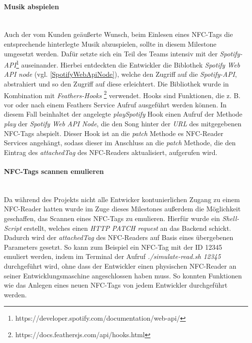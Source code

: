 \documentclass[10pt, a4paper]{article}
\begin{document}
\begin{onehalfspace}
\paragraph*{Musik abspielen} $~$ \\
Auch der vom Kunden geäußerte Wunsch, beim Einlesen eines NFC-Tags die entsprechende hinterlegte Musik abzuspielen, sollte in diesem Milestone umgesetzt werden.
Dafür setzte sich ein Teil des Teams intensiv mit der \textit{Spotify-API}\footnote{https://developer.spotify.com/documentation/web-api/} auseinander.
Hierbei entdeckten die Entwickler die Biblothek \textit{Spotify Web API node} (vgl. \ref*{SpotifyWebApiNode}), welche den Zugriff auf die \textit{Spotify-API},
abstrahiert und so den Zugriff auf diese erleichtert. Die Bibliothek wurde in Kombination mit \textit{Feathers-Hooks}
\footnote{https://docs.feathersjs.com/api/hooks.html} verwendet. Hooks sind Funktionen, die z. B. vor oder nach einem Feathers Service Aufruf ausgeführt werden
können. In diesem Fall beinhaltet der angelegte \textit{playSpotify} Hook einen Aufruf der Methode \textit{play} der \textit{Spotify Web API Node}, die den Song
hinter der \textit{URL} des mitgegebenen NFC-Tags abspielt. Dieser Hook ist an die \textit{patch} Methode es NFC-Reader Services angehängt, sodass dieser im
Anschluss an die \textit{patch} Methode, die den Eintrag des \textit{attachedTag} des NFC-Readers aktualisiert, aufgerufen wird.

\paragraph*{NFC-Tags scannen emulieren} $~$ \\
Da während des Projekts nicht alle Entwicker kontunierlichen Zugang zu einem NFC-Reader hatten wurde im Zuge dieses Milestones außerdem die Möglichkeit
geschaffen, das Scannen eines NFC-Tags zu emulieren. Hierfür wurde ein \textit{Shell-Script} erstellt, welches einen \textit{HTTP PATCH request} an
das Backend schickt. Dadurch wird der \textit{attachedTag} des NFC-Readers auf Basis eines übergebenen Parameters gesetzt. So kann zum Beispiel ein NFC-Tag mit
der ID 12345 emuliert werden, indem im Terminal der Aufruf \textit{./simulate-read.sh 12345} durchgeführt wird, ohne dass der Entwickler einen physischen NFC-Reader
an seiner Entwicklungsmaschine angeschlossen haben muss. So konnten Funktionen wie das Anlegen eines neuen NFC-Tags von jedem Entwickler durchgeführt werden.



\end{onehalfspace}
\end{document}

